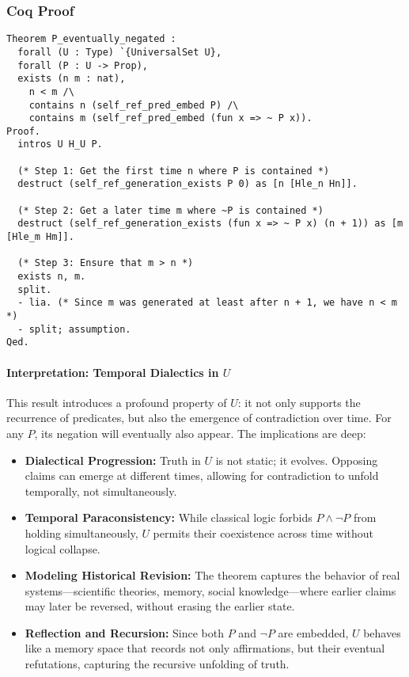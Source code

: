 \documentclass[12pt]{article}
\begin{document}
\subsubsection{Coq Proof}
\begin{lstlisting}[language=Coq]
Theorem P_eventually_negated :
  forall (U : Type) `{UniversalSet U},
  forall (P : U -> Prop), 
  exists (n m : nat),
    n < m /\
    contains n (self_ref_pred_embed P) /\
    contains m (self_ref_pred_embed (fun x => ~ P x)).
Proof.
  intros U H_U P.

  (* Step 1: Get the first time n where P is contained *)
  destruct (self_ref_generation_exists P 0) as [n [Hle_n Hn]].

  (* Step 2: Get a later time m where ~P is contained *)
  destruct (self_ref_generation_exists (fun x => ~ P x) (n + 1)) as [m [Hle_m Hm]].

  (* Step 3: Ensure that m > n *)
  exists n, m.
  split.
  - lia. (* Since m was generated at least after n + 1, we have n < m *)
  - split; assumption.
Qed.
\end{lstlisting}

\paragraph{Interpretation: Temporal Dialectics in \( U \)}
This result introduces a profound property of \( U \): it not only supports the recurrence of predicates, but also the emergence of contradiction over time. For any \( P \), its negation will eventually also appear. The implications are deep:

\begin{itemize}
    \item \textbf{Dialectical Progression:} Truth in \( U \) is not static; it evolves. Opposing claims can emerge at different times, allowing for contradiction to unfold temporally, not simultaneously.
    
    \item \textbf{Temporal Paraconsistency:} While classical logic forbids \( P \land \neg P \) from holding simultaneously, \( U \) permits their coexistence across time without logical collapse.

    \item \textbf{Modeling Historical Revision:} The theorem captures the behavior of real systems—scientific theories, memory, social knowledge—where earlier claims may later be reversed, without erasing the earlier state.

    \item \textbf{Reflection and Recursion:} Since both \( P \) and \( \neg P \) are embedded, \( U \) behaves like a memory space that records not only affirmations, but their eventual refutations, capturing the recursive unfolding of truth.
\end{itemize}
\end{document}
